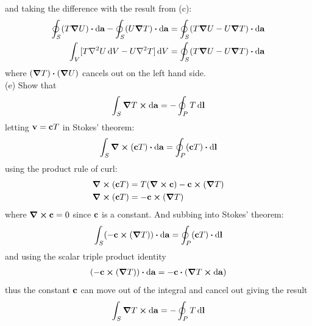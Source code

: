 \documentclass[../main.tex]{subfiles}
\begin{document}
and taking the difference with the result from (c):
\begin{align*}
    \oint_S (T \grad U) \vdot \dd{\vb{a}} - \oint_S (U \grad T) \vdot \dd{\vb{a}} &=
        \oint_S (T \grad U - U \grad T) \vdot \dd{\vb{a}} \\
    \int_V [T\laplacian U \dd{V} - U \laplacian T] \dd{V} &=
        \oint_S (T \grad U - U \grad T) \vdot \dd{\vb{a}}
\end{align*}
where $(\grad T) \vdot (\grad U)$ cancels out on the left hand side. \\
(e) Show that
\begin{align*}
    \int_S \grad T \cp \dd{\vb{a}} = - \oint_P T \dd{\vb{l}}
\end{align*}
letting $\vb{v} = \vb{c} T$ in Stokes' theorem:
\begin{align*}
    \int_S \curl(\vb{c} T) \vdot \dd{\vb{a}} = \oint_P (\vb{c} T) \vdot \dd{\vb{l}}
\end{align*}
using the product rule of curl:
\begin{align*}
    \curl(\vb{c} T) &= T (\curl \vb{c}) - \vb{c} \cp (\grad T) \\
    \curl(\vb{c} T) &= -\vb{c} \cp (\grad T)
\end{align*}
where $\curl \vb{c} = 0$ since $\vb{c}$ is a constant. And subbing into Stokes' theorem:
\begin{align*}
    \int_S (-\vb{c} \cp (\grad T)) \vdot \dd{\vb{a}} &= \oint_P (\vb{c} T) \vdot \dd{\vb{l}} \\
\end{align*}
and using the scalar triple product identity
\begin{align*}
    (-\vb{c} \cp (\grad T)) \vdot \dd{\vb{a}} = -\vb{c} \vdot (\grad T \cp \dd{\vb{a}})
\end{align*}
thus the constant $\vb{c}$ can move out of the integral and cancel out giving the result
\begin{align*}
    \int_S \grad T \cp \dd{\vb{a}} = - \oint_P T \dd{\vb{l}}
\end{align*}
\end{document}
